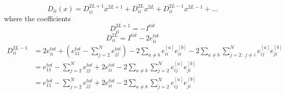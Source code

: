 \documentclass[11pt]{article}
\numberwithin{equation}{section}
\numberwithin{equation}{subsection}
\begin{document}
\begin{equation}
	D_{ii}(x)=D_{ii}^{2L+1}x^{2L+1}+D_{ii}^{2L}x^{2L}+D_{ii}^{2L-1}x^{2L-1}+\ldots
\end{equation}
where the coefficients
\begin{equation}\label{a2lp}
	D_{ii}^{2L+1}=-I^{tot}
\end{equation}\begin{equation}\label{a2l}
	D_{ii}^{2L}=I^{tot}-2e_{ii}^{tot}
\end{equation}
\begin{equation}\label{a2lm1}
	\begin{split}
		D_{ii}^{2L-1}&=2e_{ii}^{tot}+\left(e_{11}^{tot}-\sum_{j=2}^{N}e_{jj}^{tot}\right)-2\sum_{a\neq b}e_{ii}^{[a]}e_{ii}^{[b]}-2\sum_{a\neq b}\sum_{j=2\,:\,j\neq i}^{N}e_{ij}^{[a]}e_{ji}^{[b]}\\
		&=e_{11}^{tot}-\sum_{j=2}^{N}e_{jj}^{tot}+2e_{ii}^{tot}-2\sum_{a\neq b}\sum_{j=2}^{N}e_{ij}^{[a]}e_{ji}^{[b]}\\
		&=e_{11}^{tot}-\sum_{j=2}^{N}e_{jj}^{tot}+2e_{ii}^{tot}-2\sum_{a\neq b}\sum_{j=2}^{N}e_{ij}^{[a]}e_{ji}^{[b]}\\ 
	\end{split}
\end{equation}
\end{document}
